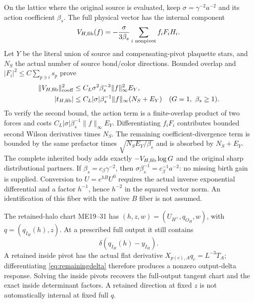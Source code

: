 \documentclass[11pt,letterpaper]{article}
\theoremstyle{plain}
\theoremstyle{remark}\newtheorem{remark}[theorem]{Scope}
\begin{document}
On the lattice where the original source is evaluated, keep
$\sigma=\gamma^{-2}a^{-2}$ and its action coefficient $\beta_s$. The full
physical vector has the internal component
\begin{equation}
V_{H,\rm fib}(f)=-\frac{\sigma}{3\beta_s}
\sum_{i\text{ nonpivot}}f_iF_iH_i.
\label{eq:Hfib}
\end{equation}
Let $Y$ be the literal union of source and compensating-pivot plaquette stars,
and $N_S$ the actual number of source bond/color directions. Bounded overlap and
$|F_i|^2\le C\sum_{p\ni i}s_p$ prove
\begin{align}
\|V_{H,\rm fib}\|_{\rm coeff}^2
&\le C_L\sigma^2\beta_s^{-3}\|f\|_\infty^2 E_Y,\label{eq:Hfibbound}\\
|t_{H,\rm fib}|
&\le C_L|\sigma|\beta_s^{-1}\|f\|_\infty(N_S+E_Y)
\quad(G=1,\ \beta_s\ge1).
\label{eq:Hscorebound}
\end{align}
To verify the second bound, the action term is a finite-overlap product of two
forces and costs $C_L|\sigma|\beta_s^{-1}\|f\|_\infty E_Y$.
Differentiating $f_iF_i$ contributes bounded second Wilson derivatives times
$N_S$. The remaining coefficient-divergence term is bounded by the same prefactor
times $\sqrt{N_SE_Y/\beta_s}$ and is absorbed by $N_S+E_Y$.
The complete inherited body adds exactly $-V_{H,\rm fib}\log G$ and the original
sharp distributional partners. If $\beta_s=c_\beta\gamma^{-2}$, then
$\sigma\beta_s^{-1}=c_\beta^{-1}a^{-2}$: no missing birth gain is supplied.
Conversion to $U=e^{hB}U^0$ requires the actual inverse exponential differential
and a factor $h^{-1}$, hence $h^{-2}$ in the squared vector norm. An identification
of this fiber with the native $B$ fiber is not assumed.

The retained-halo chart ME19--31 has
$(h,z,w)=(U_{H^+},q_{O_H},w)$, with
$q=(q_{I_H}(h),z)$. At a prescribed full output it still contains
\begin{equation}
\delta(q_{I_H}(h)-y_{I_H}).
\label{eq:remainingdelta}
\end{equation}
A retained inside pivot has the actual flat derivative
$X_{p(c),A}q_c=L^{-3}T_A$; differentiating \eqref{eq:remainingdelta} therefore
produces a nonzero output-delta response. Solving the inside pivots recovers the
full-output tangent chart and the exact inside determinant factors. A retained
direction at fixed $z$ is not automatically internal at fixed full $q$.
\end{document}
